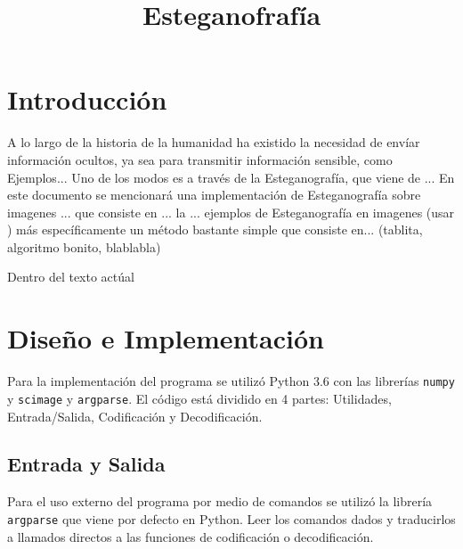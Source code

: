 \documentclass[conference]{IEEEtran}
\begin{document}
\title{Esteganofrafía}

\author{
}


\maketitle

\begin{abstract}

\end{abstract}

\section*{Introducción} %
    A lo largo de la historia de la humanidad ha existido la necesidad de envíar información ocultos, ya sea para transmitir información sensible, como  Ejemplos...
    Uno de los modos es a través de la Esteganografía, que viene de ...
    En este documento se mencionará una implementación de Esteganografía sobre imagenes ... que consiste en ... la
    ... ejemplos de Esteganografía en imagenes (usar \cite{DIS})
    más específicamente un método bastante simple que consiste en...
    (tablita, algoritmo bonito, blablabla)

    Dentro del texto actúal     
    
\section*{Diseño e Implementación}
	Para la implementación del programa se utilizó Python 3.6 con las librerías \texttt{numpy} y     
	\texttt{scimage} y \texttt{argparse}. El código está dividido en 4 partes: Utilidades, Entrada/Salida, Codificación y Decodificación.
\subsection*{Entrada y Salida}
    Para el uso externo del programa por medio de comandos se utilizó la librería \texttt{argparse} que viene por defecto en Python. Leer los comandos dados y traducirlos a llamados directos a las funciones de codificación o decodificación.
    	
\end{document}
